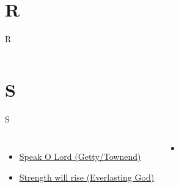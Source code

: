 \documentclass{beamer}
\begin{document}
\section{R}

\begin{frame}{R}
\begin{columns}

    


    


\end{columns}

\end{frame}

\section{S}

\begin{frame}{S}
\begin{columns}
        \begin{itemize}
    \item \hyperlink{Speak O Lord[](Getty/Townend)}{Speak O Lord (Getty/Townend)} \phantom{ 1 1 1 1}
    \item \hyperlink{Everlasting God['Strength will rise']}{Strength will rise (Everlasting God)} \phantom{}
\end{itemize}
        \begin{itemize}
            \item[] \phantom{1}\end{itemize}


\end{columns}

\end{frame}
\end{document}
